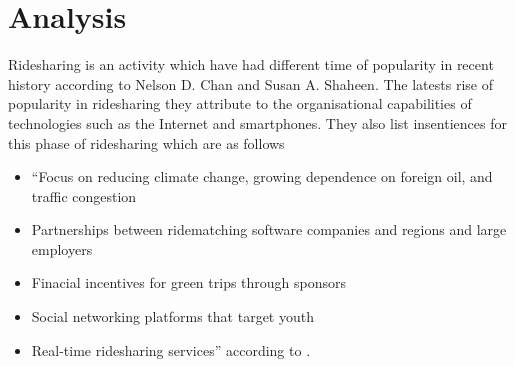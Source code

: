 \section{Analysis}
Ridesharing is an activity which have had different time of popularity in recent history according to Nelson D. Chan and Susan A. Shaheen\cite{doi:10.1080/01441647.2011.621557}.
The latests rise of popularity in ridesharing they attribute to the organisational capabilities of technologies such as the Internet and smartphones.
They also list insentiences for this phase of ridesharing which are as follows 
\begin{itemize}
  \item ``Focus on reducing climate change, growing dependence on foreign oil, and traffic congestion
  \item Partnerships between ridematching software companies and regions and large employers
  \item Finacial incentives for green trips through sponsors
  \item Social networking platforms that target youth
  \item Real-time ridesharing services'' according to \cite{doi:10.1080/01441647.2011.621557}.
\end{itemize}

